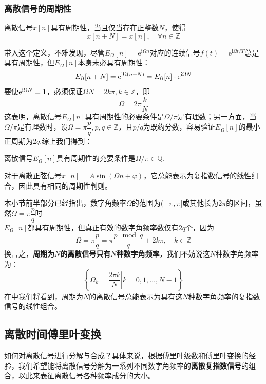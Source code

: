 \subsubsection{离散信号的周期性}

\begin{definition}[离散信号的周期性]
    离散信号$x[n]$具有周期性，当且仅当存在正整数$N$，使得
    $$x[n+N]=x[n],\quad \forall n\in\mathbb{Z}$$
\end{definition}

带入这个定义，不难发现，尽管$E_{\Omega}[n]=\mathrm{e}^{\mathrm{i}\Omega n}$对应的连续信号$f(t)=\mathrm{e}^{\mathrm{i}\Omega t/T}$总是具有周期性，但$E_{\Omega}[n]$本身未必具有周期性：
$$E_{\Omega}[n+N]=\mathrm{e}^{\mathrm{i}\Omega(n+N)}=E_{\Omega}[n]\cdot \mathrm{e}^{\mathrm{i} \Omega N}$$
要使$\mathrm{e}^{\mathrm{i} \Omega N}=1$，必须保证$\Omega N=2k\pi,k\in\mathbb{Z}$，即
$$\Omega=2\pi\frac{k}{N}$$
这表明，离散信号$E_{\Omega}[n]$具有周期性的必要条件是$\Omega/\pi$是有理数；另一方面，当$\Omega/\pi$是有理数时，设$\Omega=\pi\dfrac{p}{q},p,q\in\mathbb{Z}$，且$p/q$为既约分数，容易验证$E_{\Omega}[n]$的最小正周期为$2q$.综上我们得到：

\begin{proposition}\label{prop:discrete_period}
    离散信号$E_{\Omega}[n]$具有周期性的充要条件是$\Omega/\pi\in\mathbb{Q}$.
\end{proposition}

对于离散正弦信号$x[n]=A\sin(\Omega n+\varphi)$，它总能表示为复指数信号的线性组合，因此具有相同的周期性判则。

本小节前半部分已经指出，数字角频率$\Omega$的范围为$(-\pi,\pi]$或其他长为$2\pi$的区间，虽然$\Omega=\pi\dfrac{p}{q}$时\\
$E_{\Omega}[n]$都具有周期性，但真正有效的数字角频率数仅有$2q$个，因为
$$\Omega=\pi\dfrac{p}{q}=\pi\frac{p\mod q}{q}+2k\pi,\quad k\in\mathbb{Z}$$
换言之，\textbf{周期为$N$的离散信号只有$N$种数字角频率}，我们不妨说这$N$种数字角频率为：
\[\left\{\left.\Omega_k=\frac{2\pi k}{N}\right|k=0,1,\dots,N-1\right\}\]
在中我们将看到，周期为$N$的离散信号总能表示为具有这$N$种数字角频率的复指数信号的线性组合。

\subsection{离散时间傅里叶变换}\label{sub:dtft}

如何对离散信号进行分解与合成？具体来说，根据傅里叶级数和傅里叶变换的经验，我们希望能将离散信号分解为一系列不同数字角频率的\textbf{离散复指数信号}的组合，以此来表征离散信号各种频率成分的大小。


